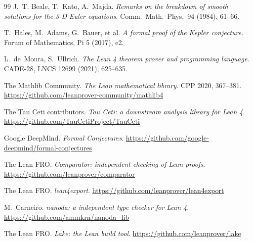 \begin{thebibliography}{99}
 J.~T. Beale, T.~Kato, A.~Majda. \emph{Remarks on the breakdown of smooth
solutions for the 3-D Euler equations}. Comm.\ Math.\ Phys.\ 94 (1984), 61--66.

 T.~Hales, M.~Adams, G.~Bauer, et al. \emph{A formal proof of the Kepler
conjecture}. Forum of Mathematics, Pi 5 (2017), e2.

 L.~de~Moura, S.~Ullrich. \emph{The Lean 4 theorem prover and programming
language}. CADE-28, LNCS 12699 (2021), 625--635.

 The Mathlib Community. \emph{The Lean mathematical library}. CPP 2020,
367--381. \url{https://github.com/leanprover-community/mathlib4}

 The Tau Ceti contributors. \emph{Tau Ceti: a downstream analysis library
for Lean 4}. \url{https://github.com/TauCetiProject/TauCeti}

 Google DeepMind. \emph{Formal Conjectures}.
\url{https://github.com/google-deepmind/formal-conjectures}

 The Lean FRO. \emph{Comparator: independent checking of Lean proofs}.
\url{https://github.com/leanprover/comparator}

 The Lean FRO. \emph{lean4export}. \url{https://github.com/leanprover/lean4export}

 M.~Carneiro. \emph{nanoda: a independent type checker for Lean 4}.
\url{https://github.com/ammkrn/nanoda_lib}

 The Lean FRO. \emph{Lake: the Lean build tool}.
\url{https://github.com/leanprover/lake}

\end{thebibliography}
